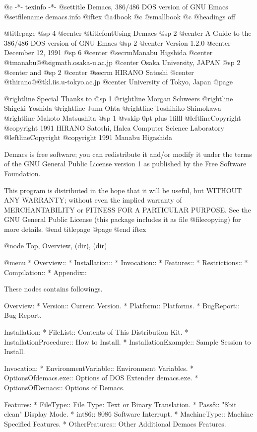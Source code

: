  @c -*- texinfo -*-
@settitle Demacs, 386/486 DOS version of GNU Emacs
@setfilename demacs.info
@iftex
@a4book
@c @smallbook
@c @headings off

@titlepage
@sp 4
@center @titlefont{Using Demacs}
@sp 2
@center A Guide to the 386/486 DOS version of GNU Emacs
@sp 2
@center Version 1.2.0
@center December 12, 1991
@sp 6
@center @secrm{Manabu Higshida}
@center @t{manabu@@sigmath.osaka-u.ac.jp}
@center Osaka University, JAPAN
@sp 2
@center and
@sp 2
@center {@secrm HIRANO Satoshi}
@center @t{hirano@@tkl.iis.u-tokyo.ac.jp}
@center University of Tokyo, Japan
@page

@rightline {Special Thanks to}
@sp 1
@rightline {Morgan Schweers}
@rightline {Shigeki Yoshida}
@rightline {Junn Ohta}
@rightline {Toshihiko Shimokawa}
@rightline {Makoto Matsushita}
@sp 1
@vskip 0pt plus 1filll
@leftline{Copyright @copyright{} 1991 HIRANO Satoshi, Halca Computer Science Laboratory}
@leftline{Copyright @copyright{} 1991 Manabu Higashida}

Demacs is free software; you can redistribute it and/or modify it under
the terms of the GNU General Public License version 1 as published by
the Free Software Foundation.

This program is distributed in the hope that it will be useful, but
WITHOUT ANY WARRANTY; without even the implied warranty of
MERCHANTABILITY or FITNESS FOR A PARTICULAR PURPOSE.  See the GNU
General Public License (this package includes it as file @file{copying})
for more details.
@end titlepage
@page
@end iftex


@node Top, Overview, (dir), (dir)

@menu
* Overview::     
* Installation:: 
* Invocation::   
* Features::      
* Restrictions:: 
* Compilation::  
* Appendix::     

These nodes contains followings.

Overview:
* Version::                Current Version.
* Platform::               Platforms.
* BugReport::              Bug Report.

Installation:
* FileList::               Contents of This Distribution Kit.
* InstallationProcedure::  How to Install.
* InstallationExample::    Sample Session to Install.

Invocation:
* EnvironmentVariable::    Environment Variables.
* OptionsOfdemacs.exe::    Options of DOS Extender demacs.exe.
* OptionsOfDemacs::        Options of Demacs.

Features:
* FileType::               File Type: Text or Binary Translation.
* Pass8::                  "8bit clean" Display Mode.
* int86::                  8086 Software Interrupt.
* MachineType::            Machine Specified Features.
* OtherFeatures::          Other Additional Demacs Features.

